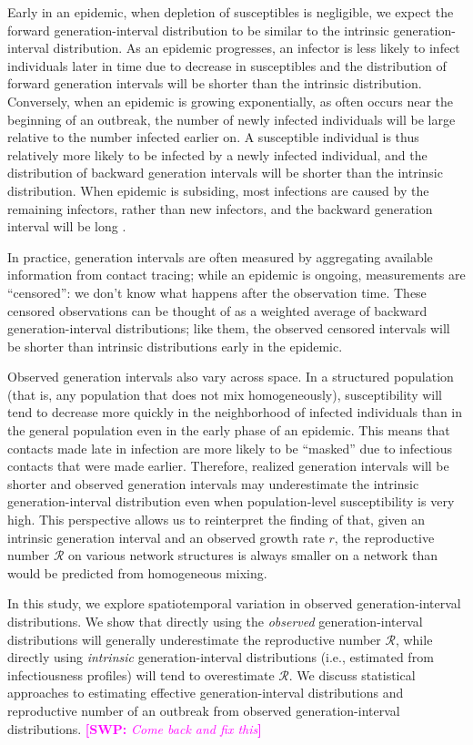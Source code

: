 \documentclass[12pt]{article}
\newcommand{\RR}{\ensuremath{{\mathcal R}}}
\newcommand{\comment}[3]{\textcolor{#1}{\textbf{[#2: }\textsl{#3}\textbf{]}}}
\newcommand{\swp}[1]{\comment{magenta}{SWP}{#1}}
\begin{document}
Early in an epidemic, when depletion of susceptibles is negligible, we expect the forward generation-interval distribution to be similar to the intrinsic generation-interval distribution.
As an epidemic progresses, an infector is less likely to infect individuals later in time due to decrease in susceptibles and the distribution of forward generation intervals will be shorter than the intrinsic distribution.
Conversely, when an epidemic is growing exponentially, as often occurs near the beginning of an outbreak, the number of newly infected individuals will be large relative to the number infected earlier on. 
A susceptible individual is thus relatively more likely to be infected by a newly infected individual, and the distribution of backward generation intervals will be shorter than the intrinsic distribution.
When epidemic is subsiding, most infections are caused by the remaining infectors, rather than new infectors, and the backward generation interval will be long \citep{champredon2015intrinsic}.

In practice, generation intervals are often measured by aggregating available information from contact tracing; while an epidemic is ongoing, measurements are ``censored'': we don't know what happens after the observation time.
These censored observations can be thought of as a weighted average of backward generation-interval distributions; like them, the observed censored intervals will be shorter than intrinsic distributions early in the epidemic.

Observed generation intervals also vary across space.
In a structured population (that is, any population that does not mix homogeneously), susceptibility will tend to decrease more quickly in the neighborhood of infected individuals than in the general population even in the early phase of an epidemic. 
This means that contacts made late in infection are more likely to be ``masked'' due to infectious contacts that were made earlier.
Therefore, realized generation intervals will be shorter and observed generation intervals may underestimate the intrinsic generation-interval distribution even when population-level susceptibility is very high.
This perspective allows us to reinterpret the finding of \cite{trapman2016inferring} that, given an intrinsic generation interval and an observed growth rate $r$, the reproductive number $\RR$ on various network structures is always smaller on a network than would be predicted from homogeneous mixing.

In this study, we explore spatiotemporal variation in observed generation-interval distributions.
We show that directly using the \emph{observed} generation-interval distributions will generally underestimate the reproductive number \RR, while directly using \emph{intrinsic} generation-interval distributions (i.e., estimated from infectiousness profiles) will tend to overestimate \RR.
We discuss statistical approaches to estimating effective generation-interval distributions and reproductive number of an outbreak from observed generation-interval distributions.
\swp{Come back and fix this}
\end{document}
